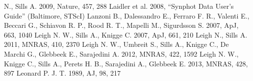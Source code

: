 \documentclass[useAMS,usenatbib]{mnras}
\begin{document}
\begin{thebibliography}{99}
  N., Sills A. 2009, Nature, 457, 288
 Laidler et al. 2008, ``Synphot Data User's Guide'' (Baltimore, STScI)
 Lanzoni B., Dalessandro E., Ferraro F. R., Valenti E., Beccari G., Schiavon R. P., Rood R. T., Mapelli M., Sigurdsson S. 2007, ApJ, 663, 1040
 Leigh
  N. W., Sills A., Knigge C. 2007, ApJ, 661, 210
 Leigh N., Sills A. 2011, MNRAS, 410, 2370
 Leigh N. W., Umbreit S.,
Sills A., Knigge C., De Marchi G., Glebbeek E., Sarajedini A. 2012, MNRAS, 422, 1592
 Leigh N. W., Knigge C.,
Sills A., Perets H. B., Sarajedini A., Glebbeek E. 2013, MNRAS, 428, 897
 Leonard
  P. J. T. 1989, AJ, 98, 217

\end{thebibliography}
\end{document}
